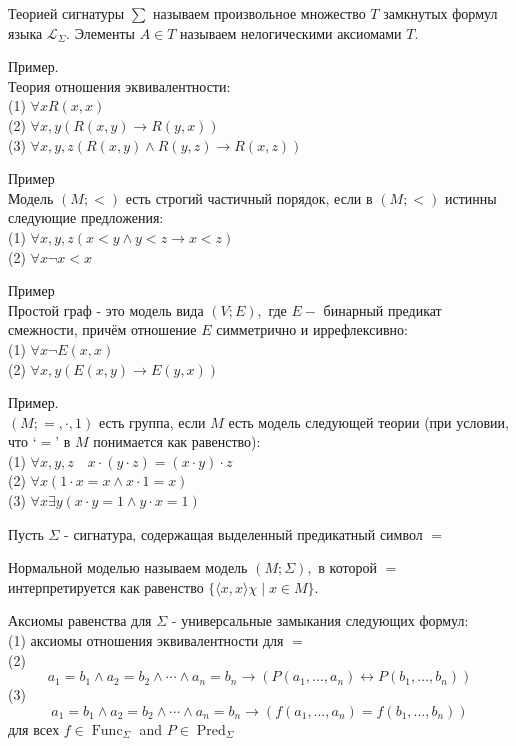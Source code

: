 \begin{defn}
Теорией сигнатуры $\sum$ называем произвольное множество $T$ замкнутых формул языка $\mathcal{L}_{\Sigma} .$ Элементы $A \in T$ называем нелогическими аксиомами $T$.
\end{defn}
Пример.\\
Теория отношения эквивалентности:\\
(1) $\forall x R(x, x)$\\
(2) $\forall x, y(R(x, y) \rightarrow R(y, x))$\\
(3) $\forall x, y, z(R(x, y) \wedge R(y, z) \rightarrow R(x, z))$
\vskip 0.2in

Пример\\
Модель $(M ;<)$ есть строгий частичный порядок, если в $(M ;<)$ истинны следующие предложения:\\
(1) $\forall x, y, z(x<y \wedge y<z \rightarrow x<z)$\\
(2) $\forall x \neg x<x$
\vskip 0.2in

Пример\\
Простой граф - это модель вида $(V ; E),$ где $E-$ бинарный предикат смежности, причём отношение $E$ симметрично и иррефлексивно:\\
(1) $\forall x \neg E(x, x)$\\
(2) $\forall x, y(E(x, y) \rightarrow E(y, x))$
\vskip 0.2in

Пример.\\
$(M ;=, \cdot, 1)$ есть группа, если $M$ есть модель следующей теории (при условии, что `$=$' в $M$ понимается как равенство):\\
(1) $\forall x, y, z \quad x \cdot(y \cdot z)=(x \cdot y) \cdot z$\\
(2) $\forall x(1 \cdot x=x \wedge x \cdot 1=x)$\\
(3) $\forall x \exists y(x \cdot y=1 \wedge y \cdot x=1)$
\vskip 0.3in

Пусть $\Sigma$ - сигнатура, содержащая выделенный предикатный символ $=$
\begin{defn}
Нормальной моделью называем модель $(M ; \Sigma),$ в которой $=$ интерпретируется как равенство $\{\langle x, x\rangle \chi \mid x \in M\}$.
\end{defn}
\vskip 0.2in

\begin{defn}
Аксиомы равенства для $\Sigma$ - универсальные замыкания следующих формул:\\
(1) аксиомы отношения эквивалентности для $=$\\
(2)
$$
a_{1}=b_{1} \wedge a_{2}=b_{2} \wedge \cdots \wedge a_{n}=b_{n} \rightarrow
\left(P\left(a_{1}, \ldots, a_{n}\right) \leftrightarrow P\left(b_{1}, \ldots, b_{n}\right)\right)
$$
(3)
$$
a_{1}=b_{1} \wedge a_{2}=b_{2} \wedge \cdots \wedge a_{n}=b_{n} \rightarrow
\left(f\left(a_{1}, \ldots, a_{n}\right)=f\left(b_{1}, \ldots, b_{n}\right)\right)
$$
для всех $f \in \operatorname{Func}_{\Sigma}$ and $P \in \operatorname{Pred}_{\Sigma}$
\end{defn}
\vskip 0.3in

